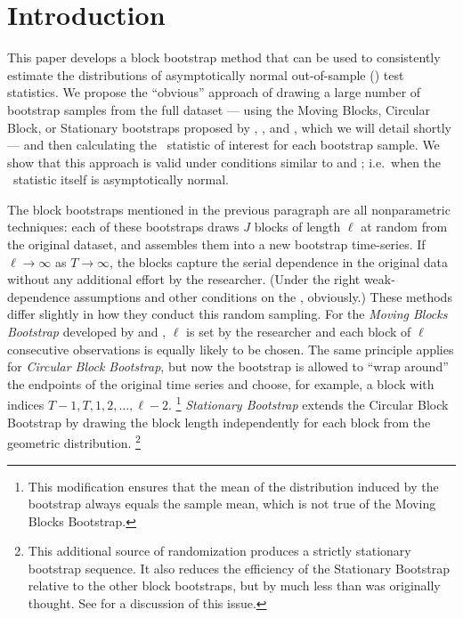 \documentclass[12pt,fleqn]{article}
\begin{document}
\newpage

\section{Introduction}

This paper develops a block bootstrap method that can be used to
consistently estimate the distributions of asymptotically normal
out-of-sample (\oos) test statistics. We propose the ``obvious''
approach of drawing a large number of bootstrap samples from the full
dataset --- using the Moving Blocks, Circular Block, or Stationary
bootstraps proposed by \cite{Kun:89}, \cite{LiS:92}, and \cite{PoR:92,PoR:94},
which we will detail shortly --- and then
calculating the \oos\ statistic of interest for each bootstrap sample.
We show that this approach is valid under conditions similar to
 and ; i.e.\ when the \oos\ statistic
itself is asymptotically normal.

The block bootstraps mentioned in the previous paragraph are all
nonparametric techniques: each of these bootstraps draws $J$ blocks of
length $\ell$ at random from the original dataset, and assembles them
into a new bootstrap time-series. If $\ell \to \infty$ as $T \to
\infty$, the blocks capture the serial dependence in the original data
without any additional effort by the researcher. (Under the right
weak-dependence assumptions and other conditions on the \dgp,
obviously.) These methods differ slightly in how they conduct this
random sampling. For the \emph{Moving Blocks Bootstrap} developed by
\cite{Kun:89} and \cite{LiS:92}, $\ell$ is set by the researcher and
each block of $\ell$ consecutive observations is equally likely to be
chosen. The same principle applies for  \emph{Circular
  Block Bootstrap}, but now the bootstrap is allowed to ``wrap
around'' the endpoints of the original time series and choose, for
example, a block with indices $T-1,T, 1, 2,\dots, \ell - 2$.
\footnote{%
  This modification ensures that the mean of the distribution induced
  by the bootstrap always equals the sample mean, which is not true of
  the Moving Blocks Bootstrap.} %
 \emph{Stationary Bootstrap} extends the Circular
Block Bootstrap by drawing the block length independently for each
block from the geometric distribution.
\footnote{%
  This additional source of randomization produces a strictly
  stationary bootstrap sequence. It also reduces the efficiency of the
  Stationary Bootstrap relative to the other block bootstraps, but by
  much less than was originally thought. See \cite{Nor:09} for a
  discussion of this issue.} %
\end{document}
